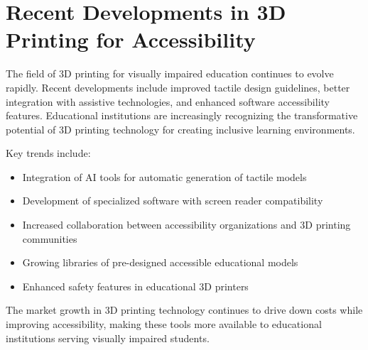 \section{Recent Developments in 3D Printing for Accessibility}\label{recent-developments}

The field of 3D printing for visually impaired education continues to evolve rapidly. Recent developments include improved tactile design guidelines, better integration with assistive technologies, and enhanced software accessibility features. Educational institutions are increasingly recognizing the transformative potential of 3D printing technology for creating inclusive learning environments.

Key trends include:
\begin{itemize}
    \item Integration of AI tools for automatic generation of tactile models
    \item Development of specialized software with screen reader compatibility
    \item Increased collaboration between accessibility organizations and 3D printing communities
    \item Growing libraries of pre-designed accessible educational models
    \item Enhanced safety features in educational 3D printers
\end{itemize}

The market growth in 3D printing technology continues to drive down costs while improving accessibility, making these tools more available to educational institutions serving visually impaired students.
